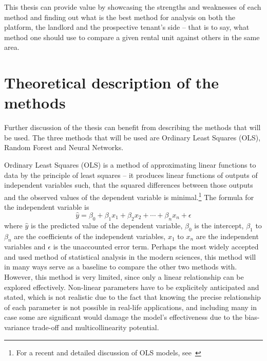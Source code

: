 \documentclass[12pt]{report}
\begin{document}
This thesis can provide value by showcasing the strengths and weaknesses of each method and finding out what is the best method for analysis on both the platform, the landlord and the prospective tenant’s side – that is to say, what method one should use to compare a given rental unit against others in the same area.
\section{Theoretical description of the methods}

Further discussion of the thesis can benefit from describing the methods that will be used. The three methods that will be used are Ordinary Least Squares (OLS), Random Forest and Neural Networks.

Ordinary Least Squares (OLS) is a method of approximating linear functions to data by the principle of least squares – it produces linear functions of outputs of independent variables such, that the squared differences between those outputs and the observed values of the dependent variable is minimal.\footnote{For a recent and detailed discussion of OLS models, see~\cite{AstiviaZumbo2019}} The formula for the independent variable is
\begin{equation}
	\hat{y} = \beta_{0} + \beta_{1}x_{1} + \beta_{2}x_{2} + \cdots + \beta_{n}x_{n} + \epsilon
\end{equation}
where $\hat{y}$ is the predicted value of the dependent variable, $\beta_0$ is the intercept, $\beta_1$ to $\beta_n$ are the coefficients of the independent variables, $x_1$ to $x_n$ are the independent variables and $\epsilon$ is the unaccounted error term.
Perhaps the most widely accepted and used method of statistical analysis in the modern sciences, this method will in many ways serve as a baseline to compare the other two methods with. However, this method is very limited, since only a linear relationship can be explored effectively. Non-linear parameters have to be explicitely anticipated and stated, which is not realistic due to the fact that knowing the precise relationship of each parameter is not possible in real-life applications, and including many in case some are significant would damage the model's effectiveness due to the bias-variance trade-off and multicollinearity potential.
\end{document}
